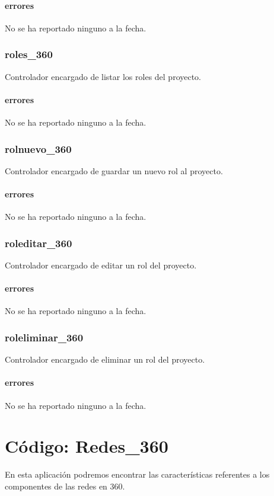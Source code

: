\documentclass[10pt,a4paper]{book}
\begin{document}
	\subsubsection{errores}
	No se ha reportado ninguno a la fecha.
	
	\subsection{roles\_360}
	Controlador encargado de listar los roles del proyecto.
	\subsubsection{errores}
	No se ha reportado ninguno a la fecha.
	
	\subsection{rolnuevo\_360}
	Controlador encargado de guardar un nuevo rol al proyecto.
	\subsubsection{errores}
	No se ha reportado ninguno a la fecha.
	
	\subsection{roleditar\_360}
	Controlador encargado de editar un rol del proyecto.
	\subsubsection{errores}
	No se ha reportado ninguno a la fecha.
	
	\subsection{roleliminar\_360}
	Controlador encargado de eliminar un rol del proyecto.
	\subsubsection{errores}
	No se ha reportado ninguno a la fecha.


	\chapter{Código: Redes\_360}
	
	En esta aplicación podremos encontrar las características referentes a los componentes de las redes en 360.
	
\end{document}
